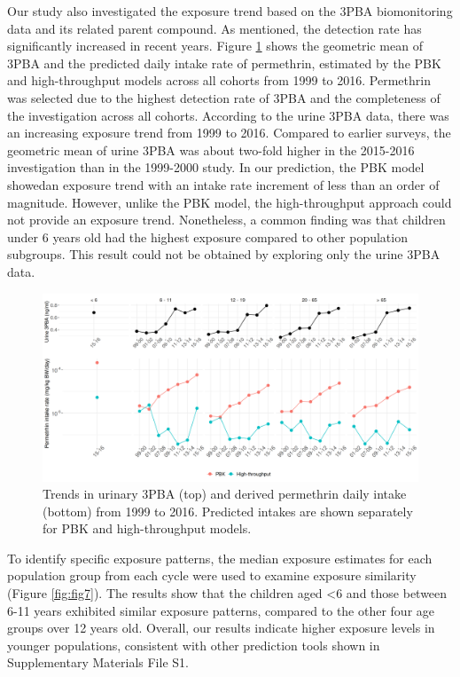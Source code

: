 \documentclass[toxics,article,submit,pdftex,moreauthors]{Definitions/mdpi}
\begin{document}
Our study also investigated the exposure trend based on the 3PBA
biomonitoring data and its related parent compound. As mentioned, the
detection rate has significantly increased in recent years. Figure
\ref{fig:fig6} shows the geometric mean of 3PBA and the predicted daily
intake rate of permethrin, estimated by the PBK and high-throughput
models across all cohorts from 1999 to 2016. Permethrin was selected due
to the highest detection rate of 3PBA and the completeness of the
investigation across all cohorts. According to the urine 3PBA data,
there was an increasing exposure trend from 1999 to 2016. Compared to
earlier surveys, the geometric mean of urine 3PBA was about two-fold
higher in the 2015-2016 investigation than in the 1999-2000 study. In our
prediction, the PBK model showedan exposure trend with an intake rate
increment of less than an order of magnitude. However, unlike the PBK
model, the high-throughput approach could not provide an exposure trend.
Nonetheless, a common finding was that children under 6 years old had
the highest exposure compared to other population subgroups. This result
could not be obtained by exploring only the urine 3PBA data.

\begin{figure}[H]
\centering
\begin{adjustwidth}{-2cm}{}
\centering
\includegraphics[width=\linewidth]{figures/fig6_trend}
\hfill
\end{adjustwidth}
\caption{Trends in urinary 3PBA (top) and derived permethrin daily intake (bottom) from 1999
to 2016. Predicted intakes are shown separately for PBK and high-throughput models.\label{fig:fig6}}
\end{figure}

To identify specific exposure patterns, the median exposure estimates
for each population group from each cycle were used to examine exposure
similarity (Figure \ref{fig:fig7}). The results show that the children
aged \textless6 and those between 6-11 years exhibited similar exposure
patterns, compared to the other four age groups over 12 years old. Overall,
our results indicate higher exposure levels in younger populations,
consistent with other prediction tools shown in Supplementary Materials
File S1.
\end{document}
